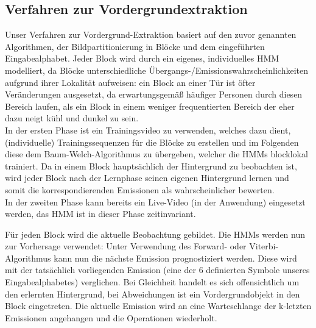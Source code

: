 \subsection{Verfahren zur Vordergrundextraktion}
\label{sec:verfahren}

Unser Verfahren zur Vordergrund-Extraktion basiert auf den zuvor genannten  Algorithmen, der Bildpartitionierung in Blöcke und dem eingeführten Eingabealphabet.
Jeder Block wird durch ein eigenes, individuelles HMM modelliert, da Blöcke unterschiedliche Übergangs-/Emissionswahrscheinlichkeiten aufgrund ihrer Lokalität aufweisen: ein Block an einer Tür ist öfter Veränderungen ausgesetzt, da erwartungsgemäß häufiger Personen durch diesen Bereich laufen, als ein Block in einem weniger frequentierten Bereich der eher dazu neigt kühl und dunkel zu sein.\\
In der ersten Phase ist ein Trainingsvideo zu verwenden, welches dazu dient, (individuelle) Trainingssequenzen für die Blöcke zu erstellen und im Folgenden diese dem Baum-Welch-Algorithmus zu übergeben, welcher die HMMs blocklokal trainiert.
Da in einem Block hauptsächlich der Hintergrund zu beobachten ist, wird jeder Block nach der Lernphase seinen eigenen Hintergrund lernen und somit die korrespondierenden Emissionen als wahrscheinlicher bewerten.\\
In der zweiten Phase kann bereits ein Live-Video (in der Anwendung) eingesetzt werden, das HMM ist in dieser Phase zeitinvariant.

Für jeden Block wird die aktuelle Beobachtung gebildet. Die HMMs werden nun zur Vorhersage verwendet: Unter Verwendung des Forward- oder Viterbi-Algorithmus kann nun die nächste Emission prognostiziert werden.
Diese wird mit der tatsächlich vorliegenden Emission (eine der 6 definierten Symbole unseres Eingabealphabetes) verglichen.
Bei Gleichheit handelt es sich offensichtlich um den erlernten Hintergrund, bei Abweichungen ist ein Vordergrundobjekt in den Block eingetreten.
Die aktuelle Emission wird an eine Warteschlange der k-letzten Emissionen angehangen und die Operationen wiederholt.

